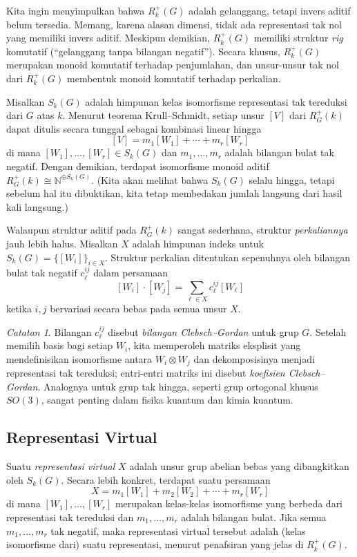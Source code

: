 \documentclass[12pt]{article}
\theoremstyle{plain}
\theoremstyle{definition}
\theoremstyle{remark}
\newtheorem{remark}[theorem]{Catatan}
\numberwithin{equation}{section}
\begin{document}
Kita ingin menyimpulkan bahwa $R^+_k(G)$ adalah gelanggang,
tetapi invers aditif belum tersedia. Memang, karena alasan dimensi, tidak ada
representasi tak nol yang memiliki invers aditif.
Meskipun demikian, $R^+_k(G)$ memiliki struktur \emph{rig} komutatif
(``gelanggang tanpa bilangan negatif'').
Secara khusus, $R^+_k(G)$ merupakan monoid komutatif terhadap penjumlahan,
dan unsur-unsur tak nol dari $R^+_k(G)$ membentuk monoid komutatif terhadap
perkalian.

Misalkan $S_k(G)$ adalah himpunan kelas isomorfisme
representasi tak tereduksi dari $G$ atas $k$.
Menurut teorema Krull--Schmidt, setiap unsur $[V]$ dari $R^+_G(k)$
dapat ditulis secara tunggal sebagai kombinasi linear hingga
\[
[V] = m_1 [W_1] + \cdots + m_r [W_r]
\]
di mana $[W_1],\ldots,[W_r] \in S_k(G)$ dan $m_1,\ldots, m_r$ adalah
bilangan bulat tak negatif.
Dengan demikian, terdapat isomorfisme monoid aditif
$R^+_G(k) \cong \mathbb{N}^{\oplus S_k(G)}$.
(Kita akan melihat bahwa $S_k(G)$ selalu hingga, tetapi sebelum hal itu
dibuktikan, kita tetap membedakan jumlah langsung dari hasil kali langsung.)

Walaupun struktur aditif pada $R^+_G(k)$ sangat sederhana,
struktur \emph{perkaliannya} jauh lebih halus.
Misalkan $X$ adalah himpunan indeks untuk $S_k(G) = \{[W_i]\}_{i \in X}$.
Struktur perkalian ditentukan sepenuhnya oleh bilangan bulat tak negatif
$c^{ij}_\ell$ dalam persamaan
\[
[W_i] \cdot [W_j] = \sum_{\ell \in X} c^{ij}_\ell [W_\ell]
\]
ketika $i,j$ bervariasi secara bebas pada semua unsur $X$.

\begin{remark}
Bilangan $c^{ij}_\ell$ disebut \emph{bilangan Clebsch--Gordan}
untuk grup $G$. Setelah memilih basis bagi setiap $W_i$,
kita memperoleh matriks eksplisit yang mendefinisikan isomorfisme antara
$W_i \otimes W_j$ dan dekomposisinya menjadi representasi tak tereduksi;
entri-entri matriks ini disebut \emph{koefisien
Clebsch--Gordan}. Analognya untuk grup tak hingga, seperti grup ortogonal khusus
$SO(3)$, sangat penting dalam fisika kuantum dan kimia
kuantum.
\end{remark}

\subsection{Representasi Virtual}

Suatu \emph{representasi virtual} $X$ adalah unsur grup abelian bebas
yang dibangkitkan oleh $S_k(G)$.
Secara lebih konkret, terdapat suatu persamaan
\[
X = m_1 [W_1] + m_2 [W_2] + \cdots + m_r [W_r]
\]
di mana $[W_1],\ldots,[W_r]$ merupakan kelas-kelas isomorfisme yang berbeda dari
representasi tak tereduksi
dan $m_1,\ldots, m_r$ adalah bilangan bulat.
Jika semua $m_1,\ldots,m_r$ tak negatif,
maka representasi virtual tersebut adalah (kelas isomorfisme dari) suatu
representasi, menurut penafsiran yang jelas di $R^+_k(G)$.
\end{document}
